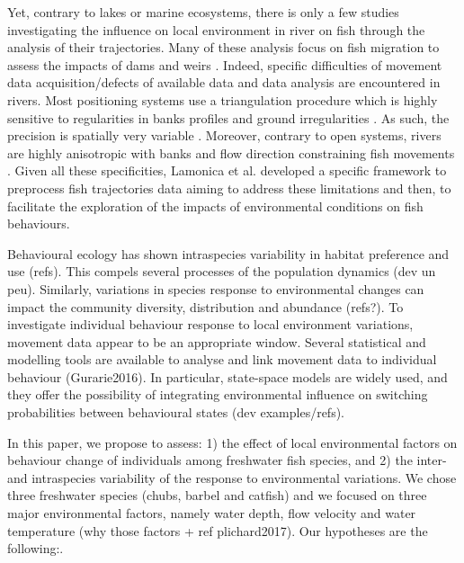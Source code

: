 \documentclass{article}
\begin{document}
\begin{linenumbers}
Yet, contrary to lakes or marine ecosystems, there is only a few studies investigating the influence on local environment in river on fish  through the analysis of their trajectories. Many of these analysis focus on fish migration to assess the impacts of dams and weirs \cite{arenas2015}\cite{benjebria2021}. Indeed, specific difficulties of movement data acquisition/defects of available data and data analysis are encountered in rivers. Most positioning systems use a triangulation procedure which is highly sensitive to regularities in banks profiles and ground irregularities \cite{cooke2013a}. As such, the precision is spatially very variable \cite{berge2012b}. Moreover, contrary to open systems, rivers are highly anisotropic with banks and flow direction constraining fish movements \cite{quaglietta2019}. Given all these specificities, Lamonica et al. \cite{lamonica2020} developed a specific framework to preprocess fish trajectories data aiming to address these limitations and then, to facilitate the exploration of the impacts of environmental conditions on fish behaviours.

Behavioural ecology has shown intraspecies variability in habitat preference and use (refs). This compels several processes of the population dynamics (dev un peu). Similarly, variations in species response to environmental changes can impact the community diversity, distribution and abundance (refs?). To investigate individual behaviour response to local environment variations, movement data appear to be an appropriate window. Several statistical and modelling tools are available to analyse and link  movement data to individual behaviour (Gurarie2016). In particular, state-space models are widely used, and they offer the possibility of integrating environmental influence on switching probabilities between behavioural states (dev examples/refs).

In this paper, we propose to assess: 1) the effect of local environmental factors on behaviour change of individuals among freshwater fish species, and 2) the inter- and intraspecies variability of the response to environmental variations. We chose three freshwater species (chubs, barbel and catfish) and we focused on three major environmental factors, namely water depth, flow velocity and water temperature (why those factors + ref plichard2017). Our hypotheses are the following:.\\


\end{linenumbers}
\end{document}
